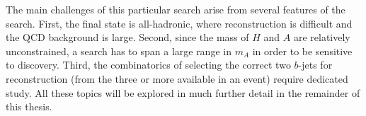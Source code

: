 The main challenges of this particular search arise from several features of the search.  First, the final state is all-hadronic, where reconstruction is difficult and the QCD background is large.  Second, since the mass of $H$ and $A$ are relatively unconstrained, a search has to span a large range in $m_A$ in order to be sensitive to discovery.  Third, the combinatorics of selecting the correct two $b$-jets for reconstruction (from the three or more available in an event) require dedicated study.  All these topics will be explored in much further detail in the remainder of this thesis.








